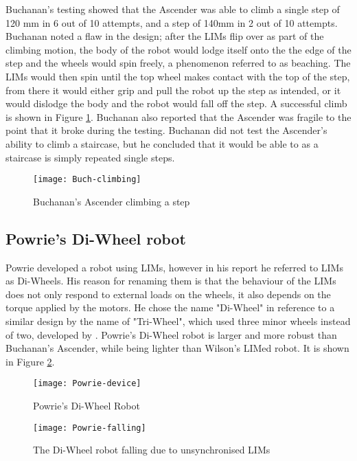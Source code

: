 Buchanan's testing showed that the Ascender was able to climb a single step of 120 mm in 6 out of 10 attempts, and a step of 140mm in 2 out of 10 attempts. Buchanan noted a flaw in the design; after the LIMs flip over as part of the climbing motion, the body of the robot would lodge itself onto the the edge of the step and the wheels would spin freely, a phenomenon referred to as beaching. The LIMs would then spin until the top wheel makes contact with the top of the step, from there it would either grip and pull the robot up the step as intended, or it would dislodge the body and the robot would fall off the step. A successful climb is shown in Figure \ref{Buch climbing}. Buchanan also reported that the Ascender was fragile to the point that it broke during the testing. Buchanan did not test the Ascender's ability to climb a staircase, but he concluded that it would be able to as a staircase is simply repeated single steps. \citep{Buchanan-2018}
\newpage
\begin{figure}[h]
	\centering
	\texttt{[image: Buch-climbing]}
	\caption{Buchanan's Ascender climbing a step \citep{Buchanan-2018}}
	\label{Buch climbing}
\end{figure}

\newpage
\subsection{Powrie's Di-Wheel robot}

Powrie developed a robot using LIMs, however in his report he referred to LIMs as Di-Wheels. His reason for renaming them is that the behaviour of the LIMs does not only respond to external loads on the wheels, it also depends on the torque applied by the motors. He chose the name "Di-Wheel" in reference to a similar design by the name of "Tri-Wheel", which used three minor wheels instead of two, developed by \cite{Smith-2015}. Powrie's Di-Wheel robot is larger and more robust than Buchanan's Ascender, while being lighter than Wilson's LIMed robot. It is shown in Figure \ref{Powrie robot}.\\

\begin{figure}[h]
	\centering
	\texttt{[image: Powrie-device]}
	\caption{Powrie's Di-Wheel Robot \citep{Powrie-2019}}
	\label{Powrie robot}
\end{figure}

\begin{wrapfigure}{r}{0.35\textwidth} %
	\centering
	\texttt{[image: Powrie-falling]}
	\caption{The Di-Wheel robot falling due to unsynchronised LIMs \citep{Powrie-2019}}
	\label{Powrie falling}
\end{wrapfigure}



